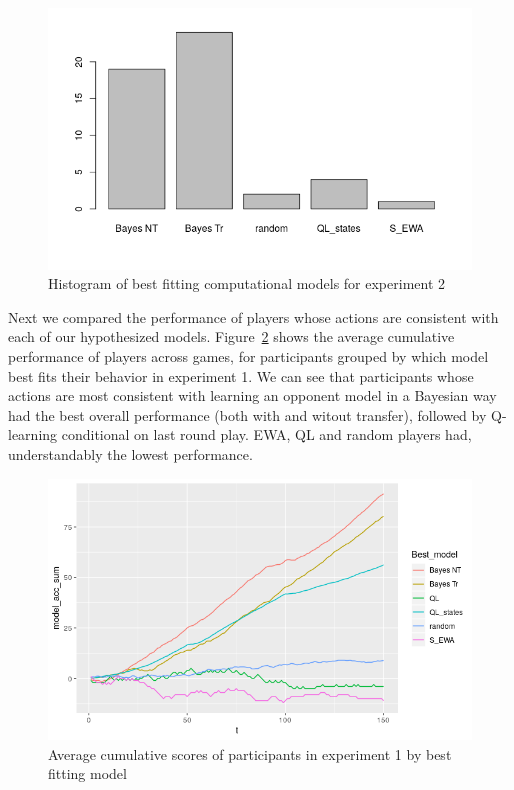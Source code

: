 \documentclass[man,floatsintext]{apa6}
\begin{document}
\begin{figure}

{\centering \includegraphics{../Report/images/exp2_comp_models} 

}

\caption{Histogram of best fitting computational models for experiment 2}\label{fig:exp2-comp-models}
\end{figure}

Next we compared the performance of players whose actions are consistent with each of our hypothesized models. Figure~\ref{fig:exp1-cumScores} shows the average cumulative performance of players across games, for participants grouped by which model best fits their behavior in experiment 1. We can see that participants whose actions are most consistent with learning an opponent model in a Bayesian way had the best overall performance (both with and witout transfer), followed by Q-learning conditional on last round play. EWA, QL and random players had, understandably the lowest performance.

\begin{figure}

{\centering \includegraphics{../Report/images/exp1_cumScores} 

}

\caption{Average cumulative scores of participants in experiment 1 by best fitting model}\label{fig:exp1-cumScores}
\end{figure}
\end{document}
